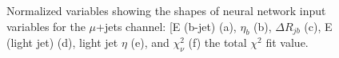 \begin{figure}[h!]
\vspace{-4.5mm}
\hfil
{}
\caption{Normalized variables showing the shapes of neural network input variables for the $\mu$+jets channel: [E (b-jet) (a), $\eta_b$ (b), $\Delta R_{jb}$ (c), E (light jet) (d), light jet $\eta$ (e), and $\chi^2_\nu$ (f) the total $\chi^2$ fit value.  }
\label{fig:VarPlots4}
\end{figure}



